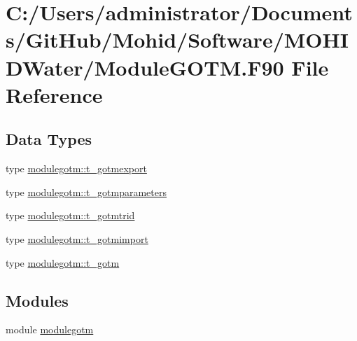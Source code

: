\hypertarget{_module_g_o_t_m_8_f90}{}\section{C\+:/\+Users/administrator/\+Documents/\+Git\+Hub/\+Mohid/\+Software/\+M\+O\+H\+I\+D\+Water/\+Module\+G\+O\+TM.F90 File Reference}
\label{_module_g_o_t_m_8_f90}
\subsection*{Data Types}
\begin{DoxyCompactItemize}
\item 
type \mbox{\hyperlink{structmodulegotm_1_1t__gotmexport}{modulegotm\+::t\+\_\+gotmexport}}
\item 
type \mbox{\hyperlink{structmodulegotm_1_1t__gotmparameters}{modulegotm\+::t\+\_\+gotmparameters}}
\item 
type \mbox{\hyperlink{structmodulegotm_1_1t__gotmtrid}{modulegotm\+::t\+\_\+gotmtrid}}
\item 
type \mbox{\hyperlink{structmodulegotm_1_1t__gotmimport}{modulegotm\+::t\+\_\+gotmimport}}
\item 
type \mbox{\hyperlink{structmodulegotm_1_1t__gotm}{modulegotm\+::t\+\_\+gotm}}
\end{DoxyCompactItemize}
\subsection*{Modules}
\begin{DoxyCompactItemize}
\item 
module \mbox{\hyperlink{namespacemodulegotm}{modulegotm}}
\end{DoxyCompactItemize}
